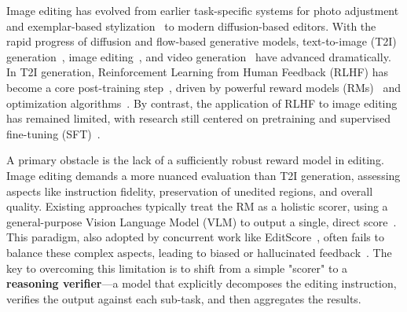 Image editing has evolved from earlier task-specific systems for photo adjustment and exemplar-based stylization~\cite{yan2016automatic,zhu2017exemplar,ruiz2023dreambooth,ye2023ip,guo2024real} to modern diffusion-based editors. 
With the rapid progress of diffusion and flow-based generative models, text-to-image (T2I) generation~\citep{ramesh2022hierarchical,saharia2022photorealistic,chang2023muse,balaji2022ediffi,rombach2022high,podell2023sdxl,esser2024scaling,betker2023improving,imagen2024imagen3,chen2023pixartalpha,chen2024pixartsigma,li2024hunyuandit,zheng2024cogview3,gong2025seedream,gao2025seedream,wu2025qwen,chen2025janus,han2025infinity}, image editing~\citep{brooks2023instructpix2pix,sheynin2024emu,ren2024byteedit,shi2024seededit,wang2025seededit,liu2025step1x,batifol2025flux,xiao2025omnigen}, and video generation~\citep{blattmann2023stable,bartal2024lumiere,brooks2024video,bao2024vidu,kong2024hunyuanvideo,moviegen2024movie,yang2025cogvideox,hacohen2025ltx,seawead2025seaweed,ma2025step,wan2025wan,gao2025seedance,seedance2025seedance,seedance2026seedance} have advanced dramatically.
In T2I generation, Reinforcement Learning from Human Feedback (RLHF) has become a core post-training step~\citep{gong2025seedream,gao2025seedream,wu2025qwen}, driven by powerful reward models (RMs)~\citep{xu2023imagereward,ma2025hpsv3,wang2025unified} and optimization algorithms~\citep{wallace2024diffusion,xu2023imagereward,xue2025dancegrpo}. By contrast, the application of RLHF to image editing has remained limited, with research still centered on pretraining and supervised fine-tuning (SFT)~\citep{wang2025seededit,deng2025emerging,batifol2025flux}.

A primary obstacle is the lack of a sufficiently robust reward model in editing. Image editing demands a more nuanced evaluation than T2I generation, assessing aspects like instruction fidelity, preservation of unedited regions, and overall quality. 
Existing approaches typically treat the RM as a holistic scorer, using a general-purpose Vision Language Model (VLM) to output a single, direct score~\citep{gong2025onereward,wei2025skywork}. 
This paradigm, also adopted by concurrent work like EditScore~\citep{luo2025editscore}, often fails to balance these complex aspects, leading to biased or hallucinated feedback~\citep{gunjal2025rubrics}. 
The key to overcoming this limitation is to shift from a simple "scorer" to a \textbf{reasoning verifier}—a model that explicitly decomposes the editing instruction, verifies the output against each sub-task, and then aggregates the results.


